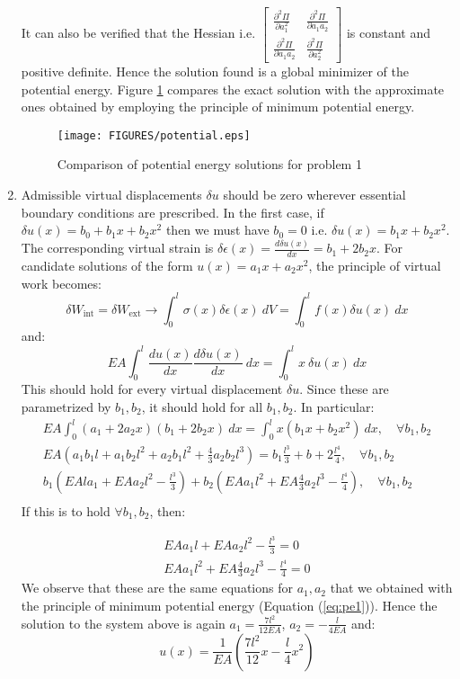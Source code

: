\documentclass{article}
\newcommand{\ee}{\end{equation}}
\newcommand{\be}{\begin{equation}}
\newcommand{\pa}{\partial}
\newcommand{\refeq}[1]{Equation (\ref{#1})}
\begin{document}
\begin{enumerate}
It can also be verified that the Hessian i.e. $\left[ \begin{array}{ll} \frac{\pa^2 \Pi}{\pa a_1^2} & \frac{\pa^2 \Pi}{\pa a_1a_2} \\ \frac{\pa^2 \Pi}{\pa a_1a_2} & \frac{\pa^2 \Pi}{\pa a_2^2} \end{array} \right]$ is constant and positive definite. Hence the solution found is a global minimizer of the potential energy.
Figure \ref{fig:sol} compares the exact solution with the approximate ones obtained by employing the principle of minimum potential energy.
\vspace{.4cm}
\begin{figure}[!h]
\centering
{}
\texttt{[image: FIGURES/potential.eps]}
\label{fig:sol}
\caption{Comparison of potential energy solutions for problem 1}
\end{figure}
 
 
 \item Admissible virtual displacements $\delta u$ should be zero wherever essential boundary conditions are prescribed.
 In the first case, if $\delta u(x)=b_0+b_1x+b_2x^2$ then we must have $b_0=0$ i.e. $\delta u(x)=b_1x+b_2x^2$. The corresponding virtual strain is $\delta \epsilon(x)=\frac{d \delta u(x)}{dx}=b_1+2b_2x$. For candidate solutions of the form $u(x)=a_1x+a_2x^2$, the principle of virtual work becomes:
 \be
 \delta W_{\textrm{int}}=\delta W_{\textrm{ext}} \to \int_{0}^l \sigma(x) \delta \epsilon (x) ~dV=\int_0^l f(x) \delta u(x) ~dx
 \ee
 and:
 \be
 EA \int_{0}^l \frac{d u(x)}{dx} \frac{d \delta u(x)}{dx} ~dx =\int_0^l x ~\delta u(x) ~dx
 \label{eq:pvw}
 \ee
 This should hold for every virtual displacement $\delta u$. Since these are parametrized by $b_1,b_2$, it should hold for all $b_1,b_2$. In particular:
 \be
 \begin{array}{l}
 EA \int_{0}^l (a_1+2a_2x)(b_1+2b_2x) ~dx =\int_0^l x (b_1x+b_2x^2)~dx, \quad \forall b_1,b_2 \\
  EA(a_1b_1 l+a_1b_2 l^2+a_2b_1 l^2+\frac{4}{3} a_2b_2 l^3)=b_1\frac{l^3}{3}+b+2\frac{l^4}{4}, \quad \forall b_1,b_2 \\
  b_1 \left(EA l a_1+EA a_2 l^2-\frac{l^3}{3} \right)  +b_2 \left(EAa_1l^2+EA \frac{4}{3} a_2 l^3-\frac{l^4}{4} \right), \quad \forall b_1,b_2 \\
  \end{array}
 \ee
 If this is to hold $\forall b_1,b_2$, then:
 
\be
\begin{array}{l}
 EAa_1 l+EA a_2 l^2-\frac{l^3}{3}=0 \\
 EAa_1l^2+EA \frac{4}{3} a_2 l^3-\frac{l^4}{4}=0
\end{array}
\ee
We observe that these are the same equations for $a_1,a_2$ that we obtained with the principle of minimum potential energy (\refeq{eq:pe1}).
Hence the  solution to the system above is again  $a_1=\frac{7l^2}{12EA}$, $a_2=-\frac{l}{4EA}$ and:
\be
u(x)=\frac{1}{EA}(\frac{7l^2}{12}x-\frac{l}{4}x^2)
\ee



\end{enumerate}
\end{document}
